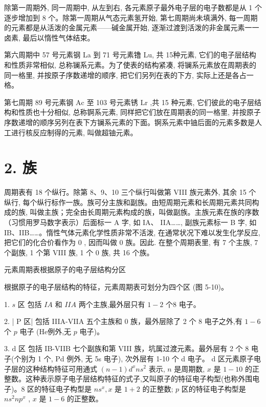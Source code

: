 \documentclass[10pt]{article}
\begin{document}
除第一周期外, 同一周期中, 从左到右, 各元素原子最外电子层的电子数都是从 1 个逐步增加到 8 个。除第一周期从气态元素氢开始, 第七周期尚未填满外, 每一周期的元素都是从活泼的金属元素——碱金属开始, 逐渐过渡到活泼的非金属元素一一卤素, 最后以惰性气体结束。

第六周期中 57 号元素钢 La 到 71 号元素镥 Lu, 共 15种元素, 它们的电子层结构和性质非常相似, 总称镧系元素。为了使表的结构紧凑, 将镧系元素放在周期表的同一格里, 并按原子序数递增的顺序, 把它们另列在表的下方, 实际上还是各占一格。

第七周期 89 号元素钢 \(\mathrm{{Ac}}\) 至 103 号元素锈 \(\mathrm{{Lr}}\) ,共 15 种元素, 它们彼此的电子层结构和性质也十分相似, 总称锕系元素, 同样把它们放在周期表的同一格里, 并按原子序数递增的顺序另列在表下方镧系元素的下面。锕系元素中铀后面的元素多数是人工进行核反应制得的元素, 叫做超铀元素。

\section*{2. 族}

周期表有 18 个纵行。除第 8、9、10 三个纵行叫做第 VIII 族元素外, 其余 15 个纵行, 每个纵行标作一族。族可分主族和副族。由短周期元素和长周期元素共同构成的族, 叫做主族；完全由长周期元素构成的族，叫做副族。主族元素在族的序数（习惯用罗马数字表示）后面标一 A 字, 如 IA、 IIA……, 副族元素标一 B 字, 如 IB、IIB……。惰性气体元素化学性质非常不活泼, 在通常状况下难以发生化学反应, 把它们的化合价看作为 0 , 因而叫做 0 族。因此. 在整个周期表里, 有 7 个主族, 7 个副族, 1 个第 VIII 族, 1 个 0 族, 共 16 个族。

元素周期表根据原子的电子层结构分区

根据原子的电子层结构的特征，元素周期表可划分为四个区 (图 5-10)。

1. \(s\) 区 包括 \({IA}\) 和 \({IIA}\) 两个主族,最外层只有 \(1 - 2\) 个8 电子。

2. | P 区| 包括 IIIA-VIIA 五个主族和 0 族，最外层除了 2 个 8 电子之外,有 \(1 - 6\) 个 \(p\) 电子 (He例外,无 \(p\) 电子)。

3. d 区 包括 IB-VIIB 七个副族和第 VIII 族，坑属过渡元素。最外层有 2 个 8 电子(个别为 1 个, Pd 例外, 无 5s 电子), 次外层有 1-10 个 d 电子。 d 区元素原子电子层的这种结构特征可用通式 \(\left( {n - 1}\right) {d}^{x}n{s}^{2}\) 表示, \(n\) 是周期数, \(x\) 是 \(1 - {10}\) 的正整数。这种表示原子电子层结构特征的式子,又叫原子的特征电子构型(也称外围电子)。8 区的特征电子构型是 \(n{s}^{x},x\) 是 \(1 + 2\) 的正整数; \(p\) 区的特征电子构型是 \(n{s}^{2}n{p}^{x}\) , \(x\) 是 \(1 - 6\) 的正整数。
\end{document}
